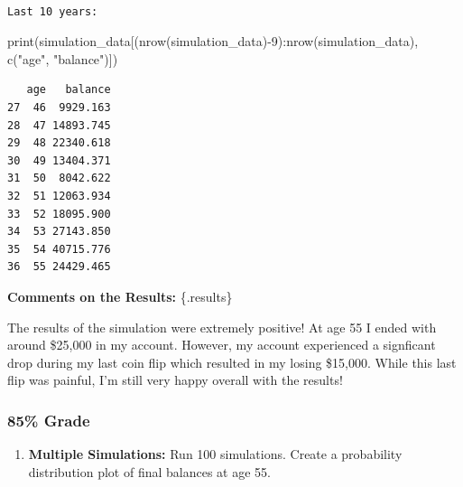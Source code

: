 \documentclass[
  letterpaper,
  DIV=11,
  numbers=noendperiod]{scrartcl}
\newenvironment{Shaded}{\begin{snugshade}}{\end{snugshade}}
\newcommand{\DecValTok}[1]{\textcolor[rgb]{0.68,0.00,0.00}{#1}}
\newcommand{\FunctionTok}[1]{\textcolor[rgb]{0.28,0.35,0.67}{#1}}
\newcommand{\NormalTok}[1]{\textcolor[rgb]{0.00,0.23,0.31}{#1}}
\newcommand{\SpecialCharTok}[1]{\textcolor[rgb]{0.37,0.37,0.37}{#1}}
\newcommand{\StringTok}[1]{\textcolor[rgb]{0.13,0.47,0.30}{#1}}
\providecommand{\tightlist}{%
  \setlength{\itemsep}{0pt}\setlength{\parskip}{0pt}}
\begin{document}
\begin{verbatim}

Last 10 years:
\end{verbatim}

\begin{Shaded}
\begin{Highlighting}[]
\FunctionTok{print}\NormalTok{(simulation\_data[(}\FunctionTok{nrow}\NormalTok{(simulation\_data)}\SpecialCharTok{{-}}\DecValTok{9}\NormalTok{)}\SpecialCharTok{:}\FunctionTok{nrow}\NormalTok{(simulation\_data), }\FunctionTok{c}\NormalTok{(}\StringTok{"age"}\NormalTok{, }\StringTok{"balance"}\NormalTok{)])}
\end{Highlighting}
\end{Shaded}

\begin{verbatim}
   age   balance
27  46  9929.163
28  47 14893.745
29  48 22340.618
30  49 13404.371
31  50  8042.622
32  51 12063.934
33  52 18095.900
34  53 27143.850
35  54 40715.776
36  55 24429.465
\end{verbatim}

\textbf{Comments on the Results:} \{.results\}

The results of the simulation were extremely positive! At age 55 I ended
with around \$25,000 in my account. However, my account experienced a
signficant drop during my last coin flip which resulted in my losing
\$15,000. While this last flip was painful, I'm still very happy overall
with the results!

\subsubsection{85\% Grade}\label{grade-1}

\begin{enumerate}
\def\labelenumi{\arabic{enumi}.}
\setcounter{enumi}{3}
\tightlist
\item
  \textbf{Multiple Simulations:} Run 100 simulations. Create a
  probability distribution plot of final balances at age 55.
\end{enumerate}
\end{document}

